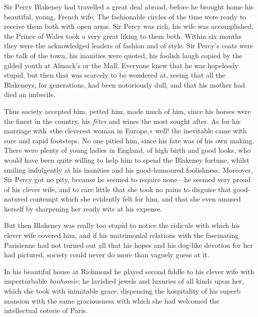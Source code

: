 Sir Percy Blakeney had travelled a great deal abroad, before he brought home his beautiful, young, French wife. The fashionable circles of the time were ready to receive them both with open arms. Sir Percy was rich, his wife was accomplished, the Prince of Wales took a very great liking to them both. Within six months they were the acknowledged leaders of fashion and of style. Sir Percy's coats were the talk of the town, his inanities were quoted, his foolish laugh copied by the gilded youth at Almack's or the Mall. Everyone knew that he was hopelessly stupid, but then that was scarcely to be wondered at, seeing that all the Blakeneys, for generations, had been notoriously dull, and that his mother had died an imbecile.

Thus society accepted him, petted him, made much of him, since his horses were the finest in the country, his \textit{fêtes} and wines the most sought after. As for his marriage with »the cleverest woman in Europe,« well! the inevitable came with sure and rapid footsteps. No one pitied him, since his fate was of his own making. There were plenty of young ladies in England, of high birth and good looks, who would have been quite willing to help him to spend the Blakeney fortune, whilst smiling indulgently at his inanities and his good-humoured foolishness. Moreover, Sir Percy got no pity, because he seemed to require none—he seemed very proud of his clever wife, and to care little that she took no pains to disguise that good-natured contempt which she evidently felt for him, and that she even amused herself by sharpening her ready wits at his expense.

But then Blakeney was really too stupid to notice the ridicule with which his clever wife covered him, and if his matrimonial relations with the fascinating Parisienne had not turned out all that his hopes and his dog-like devotion for her had pictured, society could never do more than vaguely guess at it.

In his beautiful house at Richmond he played second fiddle to his clever wife with imperturbable \textit{bonhomie}; he lavished jewels and luxuries of all kinds upon her, which she took with inimitable grace, dispensing the hospitality of his superb mansion with the same graciousness with which she had welcomed the intellectual coterie of Paris.

